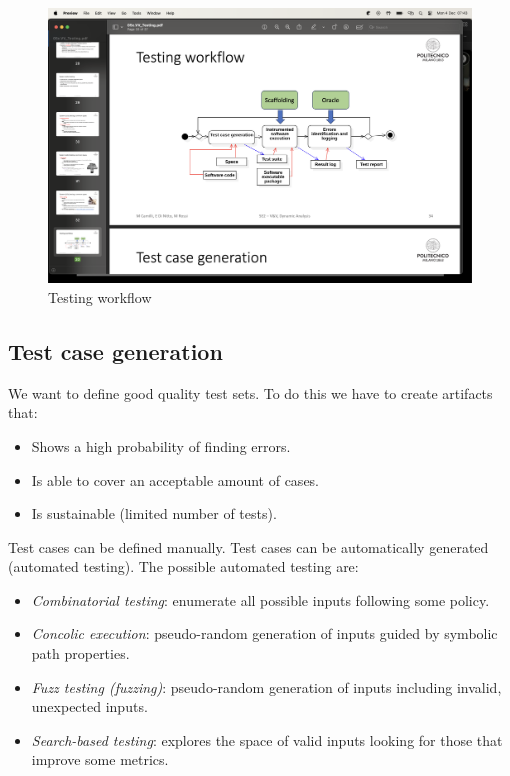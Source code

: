 \begin{figure}
    \centering
    \includegraphics[width=0.75\linewidth]{images/twf.png}
    \caption{Testing workflow}
\end{figure}

\subsection{Test case generation}
We want to define good quality test sets. 
To do this we have to create artifacts that: 
\begin{itemize}
    \item Shows a high probability of finding errors. 
    \item Is able to cover an acceptable amount of cases. 
    \item Is sustainable (limited number of tests). 
\end{itemize}
Test cases can be defined manually. 
Test cases can be automatically generated (automated testing). 
The possible automated testing are: 
\begin{itemize}
    \item \textit{Combinatorial testing}: enumerate all possible inputs following some policy. 
    \item \textit{Concolic execution}: pseudo-random generation of inputs guided by symbolic path properties. 
    \item \textit{Fuzz testing (fuzzing)}: pseudo-random generation of inputs including invalid, unexpected inputs. 
    \item \textit{Search-based testing}: explores the space of valid inputs looking for those that improve some metrics. 
\end{itemize}

